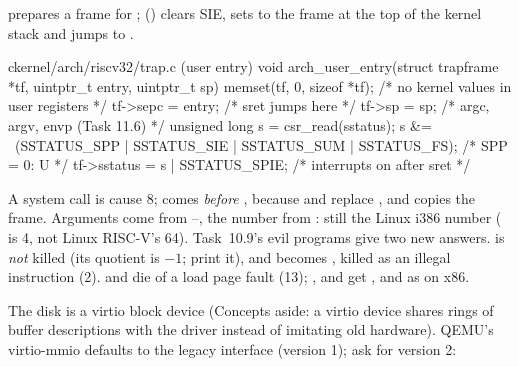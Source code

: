 \documentclass[11pt,a4paper]{article}
\begin{document}
 prepares a frame for ;  () clears SIE, sets
 to the frame at the top of the kernel stack and jumps to .

\begin{lst}{c}{kernel/arch/riscv32/trap.c (user entry)}
void arch_user_entry(struct trapframe *tf, uintptr_t entry, uintptr_t sp)
{
    memset(tf, 0, sizeof *tf);              /* no kernel values in user registers */
    tf->sepc = entry;                       /* sret jumps here                    */
    tf->sp = sp;                            /* argc, argv, envp (Task 11.6)       */
    unsigned long s = csr_read(sstatus);
    s &= ~(SSTATUS_SPP | SSTATUS_SIE | SSTATUS_SUM | SSTATUS_FS);  /* SPP = 0: U */
    tf->sstatus = s | SSTATUS_SPIE;         /* interrupts on after sret           */
}
\end{lst}

A system call is cause 8;  comes \emph{before} , because  and
 replace , and  copies the frame. Arguments come from --, the
number from : still the Linux i386 number ( is 4, not Linux RISC-V's 64). Task~10.9's evil programs
give two new answers.  is \emph{not} killed (its quotient is $-1$; print it), and  becomes
, killed as an illegal instruction (2).  and  die of a load page fault
(13); ,  and  get ,  and  as on x86.

The disk is a virtio block device (Concepts aside: a virtio device shares rings of buffer descriptions with the
driver instead of imitating old hardware). QEMU's virtio-mmio defaults to the legacy interface (version 1); ask for
version 2:

\end{document}
